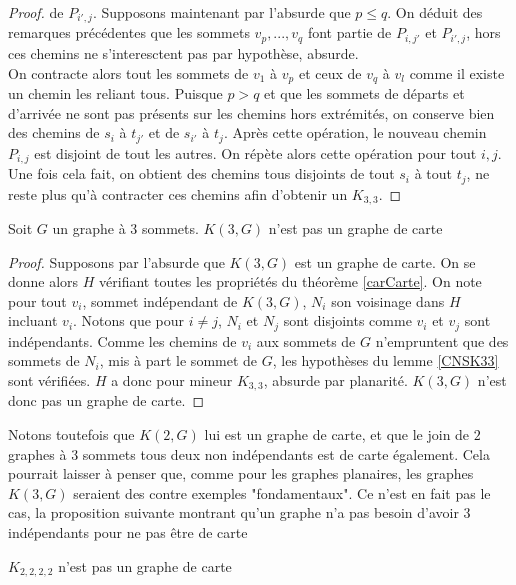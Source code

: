\documentclass{scrartcl}
\begin{document}
\begin{flushleft}
\begin{proof}
    de $P_{i',j}$. Supposons maintenant par l'absurde que $p \leq q$. On déduit des remarques précédentes que les sommets $v_p, ..., v_q$
    font partie de $P_{i,j'}$ et $P_{i',j}$, hors ces chemins ne s'interesctent pas par hypothèse, absurde.\\
    On contracte alors tout les sommets de $v_1$ à $v_p$ et ceux de $v_q$ à $v_l$ comme il existe un chemin les reliant tous. Puisque
    $p > q$ et que les sommets de départs et d'arrivée ne sont pas présents sur les chemins hors extrémités,
    on conserve bien des chemins de $s_i$ à $t_{j'}$ et de $s_{i'}$ à $t_j$. Après cette opération, le nouveau chemin $P_{i,j}$ est disjoint
    de tout les autres. On répète alors cette opération pour tout $i,j$.\\
    Une fois cela fait, on obtient des chemins tous disjoints de tout $s_i$ à tout $t_j$, ne reste plus qu'à contracter ces chemins afin
    d'obtenir un $K_{3,3}$.
\end{proof}


\begin{prop}\label{K3G}
    Soit $G$ un graphe à $3$ sommets. $K(3, G)$ n'est pas un graphe de carte
\end{prop}

\begin{proof}
    Supposons par l'absurde que $K(3, G)$ est un graphe de carte. On se donne alors $H$ vérifiant toutes les propriétés
    du théorème \ref{carCarte}. On note pour tout $v_i$, sommet indépendant de $K(3, G)$, $N_i$ son voisinage dans $H$
    incluant $v_i$. Notons que pour $i \neq j$, $N_i$ et $N_j$ sont disjoints comme $v_i$ et $v_j$ sont indépendants.
    Comme les chemins de $v_i$ aux sommets de $G$ n'empruntent que des sommets de $N_i$, mis à part le sommet de $G$,
    les hypothèses du lemme \ref{CNSK33} sont vérifiées. $H$ a donc pour mineur $K_{3,3}$, absurde par planarité.
    $K(3, G)$ n'est donc pas un graphe de carte.
\end{proof}

Notons toutefois que $K(2, G)$ lui est un graphe de carte, et que le join de $2$ graphes à $3$ sommets tous deux non indépendants
est de carte également. Cela pourrait laisser à penser que, comme pour les graphes planaires, les graphes $K(3, G)$ seraient des
contre exemples "fondamentaux". Ce n'est en fait pas le cas, la proposition suivante montrant qu'un graphe n'a pas besoin
d'avoir $3$ indépendants pour ne pas être de carte

\begin{prop}\label{K2222}
    $K_{2,2,2,2}$ n'est pas un graphe de carte
\end{prop}


\end{flushleft}
\end{document}
